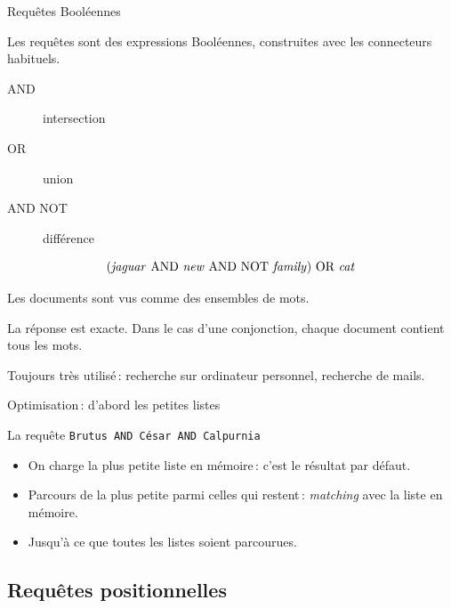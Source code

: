 \begin{frame}{Requêtes Booléennes}

Les requêtes sont des \alert{expressions Booléennes}, construites
avec les connecteurs habituels.

\begin{description}
\item[AND] intersection
\item[OR] union
\item[AND NOT] différence
\end{description}


\[\text{(\emph{jaguar} AND \emph{new} AND NOT \emph{family}) OR
\emph{cat}}\]

\vfill

Les documents sont vus comme des \alert{ensembles} de mots.

\vfill

La réponse est \alert{exacte}. Dans le cas d'une conjonction, chaque document contient
\alert{tous} les mots.

\vfill

Toujours très utilisé\,: recherche sur ordinateur personnel, recherche de mails.

\end{frame}

\begin{frame}{Optimisation\,: \alert{d'abord} les petites listes}

La requête \texttt{Brutus AND César AND Calpurnia}

\vfill


\vfil

\begin{itemize}
  \item On charge la plus petite liste en mémoire\,: c'est le résultat par défaut.
  \item Parcours de  la plus petite parmi celles qui restent\,: \textit{matching} avec la liste en mémoire.
   \item Jusqu'à ce que toutes les listes soient parcourues.
\end{itemize}

\end{frame}

\subsection{Requêtes positionnelles}

